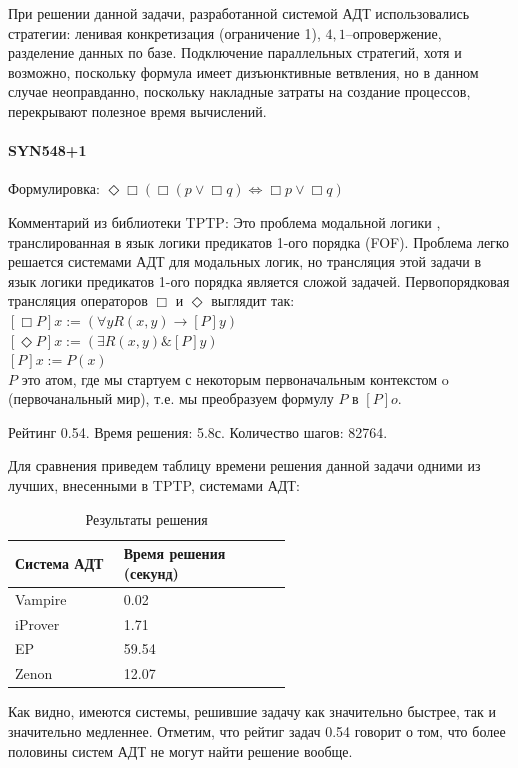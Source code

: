 При решении данной задачи, разработанной системой АДТ использовались стратегии: ленивая конкретизация (ограничение 1), $4,1$--опровержение, разделение данных по базе. Подключение параллельных стратегий, хотя и возможно, поскольку формула имеет дизъюнктивные ветвления, но в данном случае неоправданно, поскольку накладные затраты на создание процессов, перекрывают полезное время вычислений.



\paragraph{SYN548+1}
Формулировка: $\Diamond \Box (\Box (p \vee \Box q) \Leftrightarrow \Box p \vee \Box q)$

Комментарий из библиотеки TPTP: Это проблема модальной логики \cite{chellas}, транслированная в язык логики предикатов 1-ого порядка (FOF).
Проблема легко решается системами АДТ для модальных логик, но трансляция этой задачи в язык логики предикатов 1-ого порядка является сложой задачей. Первопорядковая трансляция операторов $\Box$ и $\Diamond$ выглядит так:
               	$[\Box P]x := (\forall y R(x,y) \rightarrow [P]y)$ \\
               	$[\Diamond P]x := (\exists R(x,y) \& [P]y)$ \\
               	$[P]x := P(x)$ \\
$P$ это атом, где мы стартуем с некоторым первоначальным контекстом o (первочанальный мир), т.е. мы преобразуем формулу $P$ в $[P]o$.

Рейтинг 0.54. Время решения: 5.8с. Количество шагов: 82764.

Для сравнения приведем таблицу времени решения данной задачи одними из лучших, внесенными в TPTP, системами АДТ:

\begin{longtable}[H]{|p{0.2\linewidth}|p{0.35\linewidth}|}
\caption{Результаты решения}\\
\hline
\textbf{Система АДТ} & \textbf{Время решения (секунд)}  \\
\hline
Vampire & 0.02 \\
\hline
iProver & 1.71 \\
\hline
EP & 59.54  \\
\hline
Zenon & 12.07 \\
\hline
\end{longtable}

Как видно, имеются системы, решившие задачу как значительно быстрее, так и значительно медленнее. Отметим, что рейтиг задач 0.54 говорит о том, что более половины систем АДТ не могут найти решение вообще.

